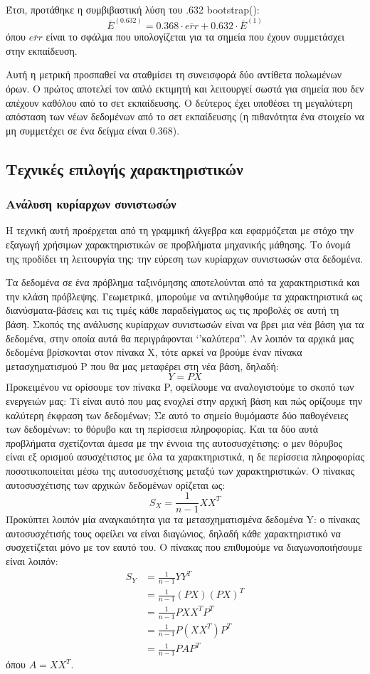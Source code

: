 \documentclass{article}
\begin{document}
Έτσι, προτάθηκε η συμβιβαστική λύση του .632 bootstrap():
$$\bar{E}^{(0.632)}= 0.368 \cdot \bar{err} + 0.632 \cdot \bar{E}^{(1)} $$
όπου $\bar{err}$ είναι το σφάλμα που υπολογίζεται για τα σημεία που έχουν συμμετάσχει στην εκπαίδευση.

Αυτή η μετρική προσπαθεί να σταθμίσει τη συνεισφορά δύο αντίθετα πολωμένων όρων. Ο πρώτος αποτελεί τον απλό εκτιμητή και λειτουργεί σωστά για σημεία που δεν απέχουν καθόλου από το σετ εκπαίδευσης. Ο δεύτερος έχει υποθέσει τη μεγαλύτερη απόσταση των νέων δεδομένων από το σετ εκπαίδευσης (η πιθανότητα ένα στοιχείο να μη συμμετέχει σε ένα δείγμα είναι $0.368$).

\subsection{Τεχνικές επιλογής χαρακτηριστικών}
\subsubsection{Ανάλυση κυρίαρχων συνιστωσών}
Η τεχνική αυτή προέρχεται από τη γραμμική άλγεβρα και εφαρμόζεται με στόχο την εξαγωγή χρήσιμων χαρακτηριστικών σε προβλήματα μηχανικής μάθησης. Το όνομά της προδίδει τη λειτουργία της: την εύρεση των κυρίαρχων συνιστωσών στα δεδομένα.

Τα δεδομένα σε ένα πρόβλημα ταξινόμησης αποτελούνται από τα χαρακτηριστικά και την κλάση πρόβλεψης. Γεωμετρικά, μπορούμε να αντιληφθούμε τα χαρακτηριστικά ως διανύσματα-βάσεις και τις τιμές κάθε παραδείγματος ως τις προβολές σε αυτή τη βάση. Σκοπός της ανάλυσης κυρίαρχων συνιστωσών είναι να βρει μια νέα βάση για τα δεδομένα, στην οποία αυτά θα περιγράφονται ‘’καλύτερα’’. Αν λοιπόν τα αρχικά μας δεδομένα βρίσκονται στον πίνακα Χ, τότε αρκεί να βρούμε έναν πίνακα μετασχηματισμού P που θα μας μεταφέρει στη νέα βάση, δηλαδή:
$$Y=P X$$
Προκειμένου να ορίσουμε τον πίνακα P, οφείλουμε να αναλογιστούμε το σκοπό των ενεργειών μας: Τί είναι αυτό που μας ενοχλεί στην αρχική βάση και πώς ορίζουμε την καλύτερη έκφραση των δεδομένων; Σε αυτό το σημείο θυμόμαστε δύο παθογένειες των δεδομένων: το θόρυβο και τη περίσσεια πληροφορίας. Και τα δύο αυτά προβλήματα σχετίζονται άμεσα με την έννοια της αυτοσυσχέτισης: ο μεν θόρυβος είναι εξ ορισμού ασυσχέτιστος με όλα τα χαρακτηριστικά, η δε περίσσεια πληροφορίας ποσοτικοποιείται μέσω της αυτοσυσχέτισης μεταξύ των χαρακτηριστικών. Ο πίνακας αυτοσυσχέτισης των αρχικών δεδομένων ορίζεται ως:
$$S_X=\frac{1}{n-1} X X^T$$
Προκύπτει λοιπόν μία αναγκαιότητα για τα μετασχηματισμένα δεδομένα Y: ο πίνακας αυτοσυσχέτισής τους οφείλει να είναι διαγώνιος, δηλαδή κάθε χαρακτηριστικό να συσχετίζεται μόνο με τον εαυτό του. Ο πίνακας που επιθυμούμε να διαγωνοποιήσουμε είναι λοιπόν:
\begin{equation*} 
\begin{split}
S_Y & = \frac{1}{n-1} Y Y^T \\
 & = \frac{1}{n-1} (PX)(PX)^T \\
  & = \frac{1}{n-1} PXX^TP^T\\
   & = \frac{1}{n-1} P(XX^T)P^T\\
    & = \frac{1}{n-1} PAP^T
\end{split}
\end{equation*}
όπου $A=XX^T$.
\end{document}
